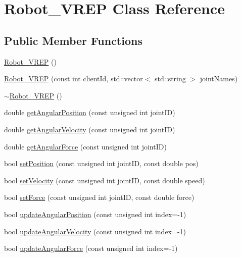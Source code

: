 \hypertarget{class_robot___v_r_e_p}{}\section{Robot\+\_\+\+V\+R\+EP Class Reference}
\label{class_robot___v_r_e_p}
\subsection*{Public Member Functions}
\begin{DoxyCompactItemize}
\item 
\hyperlink{class_robot___v_r_e_p_a9dc0b2a836ff671fbf6fdbe41d79aaa9}{Robot\+\_\+\+V\+R\+EP} ()
\item 
\hyperlink{class_robot___v_r_e_p_a6033bb809e8bff4443c8382cdc5d6702}{Robot\+\_\+\+V\+R\+EP} (const int client\+Id, std\+::vector$<$ std\+::string $>$ joint\+Names)
\item 
\hyperlink{class_robot___v_r_e_p_a19216cb4b4aff3541330dd935444cb4b}{$\sim$\+Robot\+\_\+\+V\+R\+EP} ()
\item 
double \hyperlink{class_robot___v_r_e_p_ad3b09d08a37807eccd49f99e46113ff3}{get\+Angular\+Position} (const unsigned int joint\+ID)
\item 
double \hyperlink{class_robot___v_r_e_p_aa838e8dce05053eacf4e4c4e20f06c31}{get\+Angular\+Velocity} (const unsigned int joint\+ID)
\item 
double \hyperlink{class_robot___v_r_e_p_ac7d1ea82dac84b23eba4401b5ef8c9d0}{get\+Angular\+Force} (const unsigned int joint\+ID)
\item 
bool \hyperlink{class_robot___v_r_e_p_aff762585c7876bd112f8897d9351f76b}{set\+Position} (const unsigned int joint\+ID, const double pos)
\item 
bool \hyperlink{class_robot___v_r_e_p_a25ccf81b13b4ef684f03731adacf0966}{set\+Velocity} (const unsigned int joint\+ID, const double speed)
\item 
bool \hyperlink{class_robot___v_r_e_p_ad3f957c19e296f4380d3fcd4dfac1d1b}{set\+Force} (const unsigned int joint\+ID, const double force)
\item 
bool \hyperlink{class_robot___v_r_e_p_ad916176d052133d8f87688ca308d94f9}{update\+Angular\+Position} (const unsigned int index=-\/1)
\item 
bool \hyperlink{class_robot___v_r_e_p_a066997889ab5b2ef9ffddd93a8bf9531}{update\+Angular\+Velocity} (const unsigned int index=-\/1)
\item 
bool \hyperlink{class_robot___v_r_e_p_ab67bc62a8a02e2bbfbd69c0be383fc89}{update\+Angular\+Force} (const unsigned int index=-\/1)

\end{DoxyCompactItemize}
